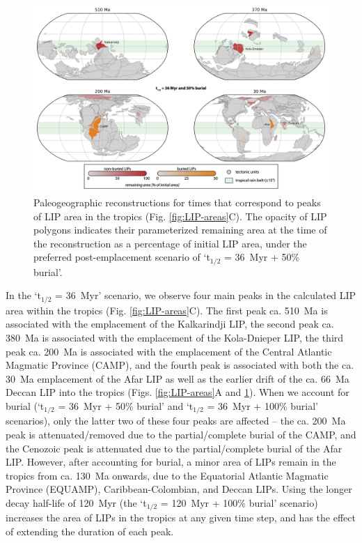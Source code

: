 \begin{figure}[h!]
\begin{center}
	\includegraphics[width=\textwidth]{figures/LIPs/reconstruction-snapshots.jpg}
	\caption[Paleogeographic reconstructions for times that correspond to peaks of large igneous province area in the tropics.]{Paleogeographic reconstructions for times that correspond to peaks of LIP area in the tropics (Fig. \ref{fig:LIP-areas}C). The opacity of LIP polygons indicates their parameterized remaining area at the time of the reconstruction as a percentage of initial LIP area, under the preferred post-emplacement scenario of `t$_{1/2}$ = 36~Myr + 50\% burial'.}
	\label{fig:reconstruction-snapshots}
\end{center}
\end{figure}

In the `t$_{1/2}$ = 36~Myr' scenario, we observe four main peaks in the calculated LIP area within the tropics (Fig. \ref{fig:LIP-areas}C). The first peak ca. 510~Ma is associated with the emplacement of the Kalkarindji LIP, the second peak ca. 380~Ma is associated with the emplacement of the Kola-Dnieper LIP, the third peak ca. 200~Ma is associated with the emplacement of the Central Atlantic Magmatic Province (CAMP), and the fourth peak is associated with both the ca. 30~Ma emplacement of the Afar LIP as well as the earlier drift of the ca. 66~Ma Deccan LIP into the tropics (Figs. \ref{fig:LIP-areas}A and \ref{fig:reconstruction-snapshots}). When we account for burial (`t$_{1/2}$ = 36~Myr + 50\% burial' and `t$_{1/2}$ = 36~Myr + 100\% burial' scenarios), only the latter two of these four peaks are affected -- the ca. 200~Ma peak is attenuated/removed due to the partial/complete burial of the CAMP, and the Cenozoic peak is attenuated due to the partial/complete burial of the Afar LIP. However, after accounting for burial, a minor area of LIPs remain in the tropics from ca. 130~Ma onwards, due to the Equatorial Atlantic Magmatic Province (EQUAMP), Caribbean-Colombian, and Deccan LIPs. Using the longer decay half-life of 120~Myr (the `t$_{1/2}$ = 120~Myr + 100\% burial' scenario) increases the area of LIPs in the tropics at any given time step, and has the effect of extending the duration of each peak.

